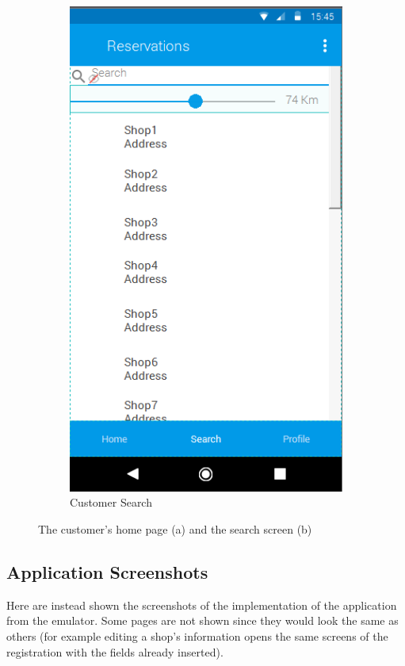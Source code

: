 \begin{figure}[h]
\begin{subfigure}{.5\textwidth}
  \includegraphics[height=.4\textheight, keepaspectratio=true]{Img/Mockup_Customer_Search}
  \caption{Customer Search}
\end{subfigure}
\caption{The customer's home page (a) and the search screen (b)}
\end{figure}
\clearpage
\subsection{Application Screenshots}
Here are instead shown the screenshots of the implementation of the application from the emulator. Some pages are not shown since they would look the same as others (for example editing a shop's information opens the same screens of the registration with the fields already inserted).

